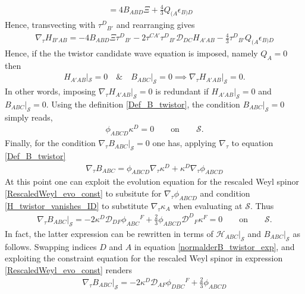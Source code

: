 \documentclass[10pt,a4paper]{article}
\theoremstyle{plain}
\begin{document}
{\begin{align}
  = 4 B_{ABD} \Xi  + \tfrac{4}{3} Q_{(A}\epsilon _{B)D}\quad 
\end{align}
Hence, transvecting with $\tau^{D}{}_{B'}$ and rearranging gives
\begin{align}
\nabla_\tau H_{B'AB} = -4 B_{ABD} \Xi  \tau ^{D}{}_{B'}  -2 \tau ^{CA'} \tau ^{D}{}_{B'} \mathcal{D} _{DC}H_{A'AB}  - \tfrac{4}{3} \tau ^{D}{}_{B'}Q_{(A}\epsilon _{B)D}
\end{align}
Hence, if the  the twistor candidate wave equation is imposed, namely $Q_A=0$ then
\begin{align}
H_{A'AB}|_{\mathcal{S}}=0\quad \& \quad B_{ABC}|_{\mathcal{S}}=0 \implies \nabla_\tau H_{A'AB}|_{\mathcal{S}}=0.
\end{align}
In other words, imposing $\nabla_\tau H_{A'AB}|_{\mathcal{S}}=0$ is redundant if
$H_{A'AB}|_{\mathcal{S}}=0$ and $ B_{ABC}|_{\mathcal{S}}=0$. Using the definition \eqref{Def_B_twistor},
the condition $B_{ABC}|_{\mathcal{S}}=0$ simply reads,
\begin{align}
  \phi_{ABCD}\kappa^D=0 \qquad \text{on} \qquad \mathcal{S}.
\end{align}
Finally, for the condition $\nabla_{\tau}B_{ABC}|_{\mathcal{S}}=0$ one has, applying $\nabla_\tau$ to
equation \eqref{Def_B_twistor}
\begin{align}
\nabla_\tau B_{ABC} = \phi _{ABCD}\nabla_\tau \kappa ^{D}  + \kappa ^{D} \nabla_\tau \phi _{ABCD} 
\end{align}
At this point one can exploit the evolution equation for the rescaled
Weyl spinor \eqref{RescaledWeyl_evo_const} to subsitute for
$\nabla_\tau \phi_{ABCD}$ and condition \eqref {H_twistor_vanishes_ID}
to substitute $\nabla_\tau \kappa_A$ when evaluating at
$\mathcal{S}$. Thus
\begin{align}\label{normalderB_twistor_exp}
\nabla_{\tau}B_{ABC}|_{\mathcal{S}}= -2\kappa ^{D} \mathcal{D} _{DF}\phi _{ABC}{}^{F} + \tfrac{2}{3}  \phi
_{ABCD} \mathcal{D} ^{D}{}_{F}\kappa ^{F} = 0 \qquad \text{on} \qquad \mathcal{S}.
\end{align}
In fact, the latter expression can be rewritten in terms of $\mathcal{H}_{ABC}|_{\mathcal{S}}$
and $B_{ABC}|_{\mathcal{S}}$ as follows. Swapping indices $D$ and $A$ in equation
\eqref{normalderB_twistor_exp}, and exploiting the constraint equation for the rescaled Weyl spinor in expression
\eqref{RescaledWeyl_evo_const} renders
\begin{align}\label{normalderB_twistor_exp2}
\nabla_{\tau}B_{ABC}|_{\mathcal{S}}= -2 \kappa ^{D} \mathcal{D} _{AF}\phi _{DBC}{}^{F} + \tfrac{2}{3} \phi _{ABCD}

\end{align}}
\end{document}
